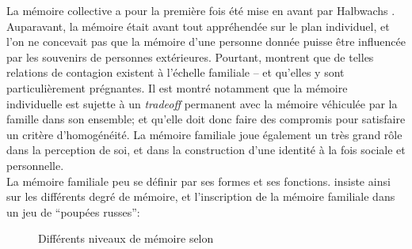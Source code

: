 \documentclass[french]{article}
\begin{document}
			La mémoire collective a pour la première fois été mise en avant par Halbwachs \cite{halbwachs1925,halbwachs1950}. Auparavant, la mémoire était avant tout appréhendée sur le plan individuel, et l'on ne concevait pas que la mémoire d'une personne donnée puisse être influencée par les souvenirs de personnes extérieures. Pourtant, \cite{muxel2012a,muxel2012b,garstenauer2012} montrent que de telles relations de contagion existent à l'échelle familiale -- et qu'elles y sont particulièrement prégnantes. Il est montré notamment que la mémoire individuelle est sujette à un \textit{tradeoff} permanent avec la mémoire véhiculée par la famille dans son ensemble; et qu'elle doit donc faire des compromis pour satisfaire un critère d'homogénéité. La mémoire familiale joue également un très grand rôle dans la perception de soi, et dans la construction d'une identité à la fois sociale et personnelle.\\
			La mémoire familiale peu se définir par ses formes et ses fonctions. \cite{muxel2012a} insiste ainsi sur les différents degré de mémoire, et l'inscription de la mémoire familiale dans un jeu de ``poupées russes'':
			\begin{figure}[H]
				\centering
				\caption{Différents niveaux de mémoire selon \cite{muxel2012a}}
			\end{figure}
\end{document}

